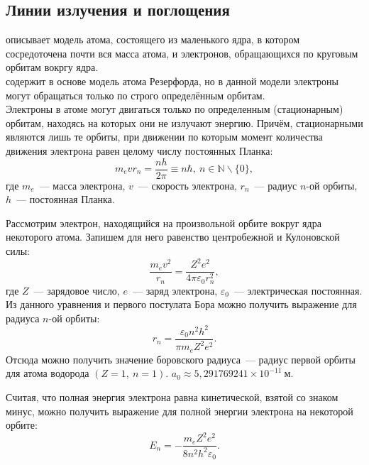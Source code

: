 \subsection{Линии излучения и поглощения}

 описывает модель атома, состоящего из маленького ядра, в котором сосредоточена почти вся масса атома, и электронов, обращающихся по круговым орбитам вокргу ядра. \\

 содержит в основе модель атома Резерфорда, но в данной модели электроны могут обращаться только по строго определённым орбитам.\\

 Электроны в атоме могут двигаться только по определенным (стационарным) орбитам, находясь на которых они не излучают энергию.  Причём, стационарными являются лишь те орбиты, при движении по которым момент количества движения электрона равен целому числу постоянных Планка:
\begin{equation}
	m_e v r_n = \frac{n h}{2 \pi} \equiv n \hbar,~n \in \mathbb{N} \backslash \lbrace 0 \rbrace,
\end{equation}
где $m_e$~--- масса электрона, $v$~--- скорость электрона, $r_n$~--- радиус $n$-ой орбиты, $h$~--- постоянная Планка.

Рассмотрим электрон, находящийся на произвольной орбите вокруг ядра некоторого атома. Запишем для него равенство центробежной и Кулоновской силы:
\begin{equation}
	\frac{m_e v^2}{r_n} = \frac{Z^2 e^2}{4 \pi \varepsilon_0 r_n^2},
\end{equation}
где $Z$~--- зарядовое число, $e$~--- заряд электрона, $\varepsilon_0$~--- электрическая постоянная. Из данного уравнения и первого постулата Бора можно получить выражение для радиуса $n$-ой орбиты:
\begin{equation}
	r_n = \frac{\varepsilon_0 n^2 h^2}{\pi m_e Z^2 e^2}.
\end{equation}
Отсюда можно получить значение боровского радиуса~--- радиус первой орбиты для атома водорода $(Z = 1,~n = 1)$. $a_0 \approx 5,291769241 \times 10^{-11}~\text{м}$.

Считая, что полная энергия электрона равна кинетической, взятой со знаком минус, можно получить выражение для полной энергии электрона на некоторой орбите:
\begin{equation}
	E_n = -\frac{m_e Z^2 e^2}{8 n^2 h^2 \varepsilon_0}.
\end{equation}

